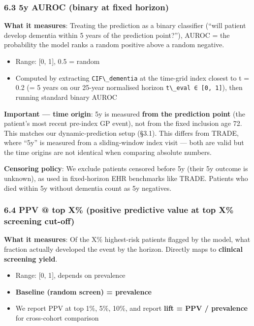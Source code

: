 \documentclass[
  11pt,
]{article}
\newcommand{\passthrough}[1]{#1}
\providecommand{\tightlist}{%
  \setlength{\itemsep}{0pt}\setlength{\parskip}{0pt}}
\begin{document}
\subsubsection{6.3 5y AUROC (binary at fixed
horizon)}\label{y-auroc-binary-at-fixed-horizon}

\textbf{What it measures}: Treating the prediction as a binary
classifier (``will patient develop dementia within 5 years of the
prediction point?''), AUROC = the probability the model ranks a random
positive above a random negative.

\begin{itemize}
\tightlist
\item
  Range: {[}0, 1{]}, 0.5 = random
\item
  Computed by extracting \passthrough{\lstinline!CIF\_dementia!} at the
  time-grid index closest to t = 0.2 (= 5 years on our 25-year
  normalised horizon \passthrough{\lstinline!t\_eval ∈ [0, 1]!}), then
  running standard binary AUROC
\end{itemize}

\textbf{Important --- time origin}: 5y is measured \textbf{from the
prediction point} (the patient's most recent pre-index GP event), not
from the fixed inclusion age 72. This matches our dynamic-prediction
setup (§3.1). This differs from TRADE, where ``5y'' is measured from a
sliding-window index visit --- both are valid but the time origins are
not identical when comparing absolute numbers.

\textbf{Censoring policy}: We exclude patients censored before 5y (their
5y outcome is unknown), as used in fixed-horizon EHR benchmarks like
TRADE. Patients who died within 5y without dementia count as 5y
negatives.

\subsubsection{6.4 PPV @ top X\% (positive predictive value at top X\%
screening
cut-off)}\label{ppv-top-x-positive-predictive-value-at-top-x-screening-cut-off}

\textbf{What it measures}: Of the X\% highest-risk patients flagged by
the model, what fraction actually developed the event by the horizon.
Directly maps to \textbf{clinical screening yield}.

\begin{itemize}
\tightlist
\item
  Range: {[}0, 1{]}, depends on prevalence
\item
  \textbf{Baseline (random screen) = prevalence}
\item
  We report PPV at top 1\%, 5\%, 10\%, and report \textbf{lift = PPV /
  prevalence} for cross-cohort comparison
\end{itemize}
\end{document}
